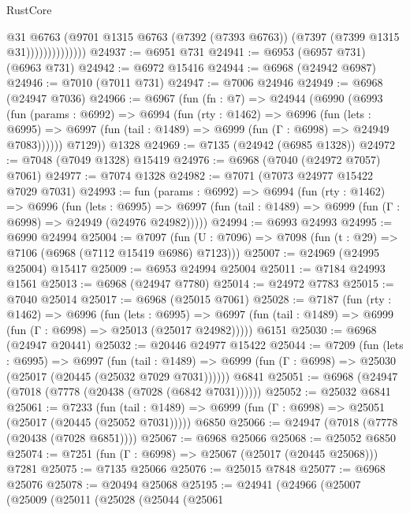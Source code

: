 \begin{lexlean}{RustCore}
\begin{coremodule}
                          @31
                          @6763
                          (@9701
                            @1315
                            @6763
                            (@7392 (@7393 @6763))
                            (@7397 (@7399 @1315 @31))))))))))))))
@24937 := @6951 @731
@24941 := @6953 (@6957 @731) (@6963 @731)
@24942 := @6972 @15416
@24944 := @6968 (@24942 @6987)
@24946 := @7010 (@7011 @731)
@24947 := @7006 @24946
@24949 := @6968 (@24947 @7036)
@24966 := @6967
    (fun (fn : @7) =>
    @24944
      (@6990
        (@6993
          (fun (params : @6992) =>
          @6994
            (fun (rty : @1462) =>
            @6996
              (fun (lets : @6995) =>
              @6997 (fun (tail : @1489) => @6999 (fun (Γ : @6998) => @24949 @7083))))))
        @7129))
    @1328
@24969 := @7135 (@24942 (@6985 @1328))
@24972 := @7048 (@7049 @1328) @15419
@24976 := @6968 (@7040 (@24972 @7057) @7061)
@24977 := @7074 @1328
@24982 := @7071 (@7073 @24977 @15422 @7029 @7031)
@24993 := fun (params : @6992) =>
  @6994
    (fun (rty : @1462) =>
    @6996
      (fun (lets : @6995) =>
      @6997 (fun (tail : @1489) => @6999 (fun (Γ : @6998) => @24949 (@24976 @24982)))))
@24994 := @6993 @24993
@24995 := @6990 @24994
@25004 := @7097
    (fun (U : @7096) => @7098 (fun (t : @29) => @7106 (@6968 (@7112 @15419 @6986) @7123)))
@25007 := @24969 (@24995 @25004) @15417
@25009 := @6953 @24994 @25004
@25011 := @7184 @24993 @1561
@25013 := @6968 (@24947 @7780)
@25014 := @24972 @7783
@25015 := @7040 @25014
@25017 := @6968 (@25015 @7061)
@25028 := @7187
    (fun (rty : @1462) =>
    @6996
      (fun (lets : @6995) =>
      @6997 (fun (tail : @1489) => @6999 (fun (Γ : @6998) => @25013 (@25017 @24982)))))
    @6151
@25030 := @6968 (@24947 @20441)
@25032 := @20446 @24977 @15422
@25044 := @7209
    (fun (lets : @6995) =>
    @6997
      (fun (tail : @1489) =>
      @6999 (fun (Γ : @6998) => @25030 (@25017 (@20445 (@25032 @7029 @7031))))))
    @6841
@25051 := @6968 (@24947 (@7018 (@7778 (@20438 (@7028 (@6842 @7031))))))
@25052 := @25032 @6841
@25061 := @7233
    (fun (tail : @1489) => @6999 (fun (Γ : @6998) => @25051 (@25017 (@20445 (@25052 @7031)))))
    @6850
@25066 := @24947 (@7018 (@7778 (@20438 (@7028 @6851))))
@25067 := @6968 @25066
@25068 := @25052 @6850
@25074 := @7251 (fun (Γ : @6998) => @25067 (@25017 (@20445 @25068))) @7281
@25075 := @7135 @25066
@25076 := @25015 @7848
@25077 := @6968 @25076
@25078 := @20494 @25068
@25195 := @24941
    (@24966
      (@25007
        (@25009
          (@25011
            (@25028
              (@25044
                (@25061

\end{coremodule}
\end{lexlean}
